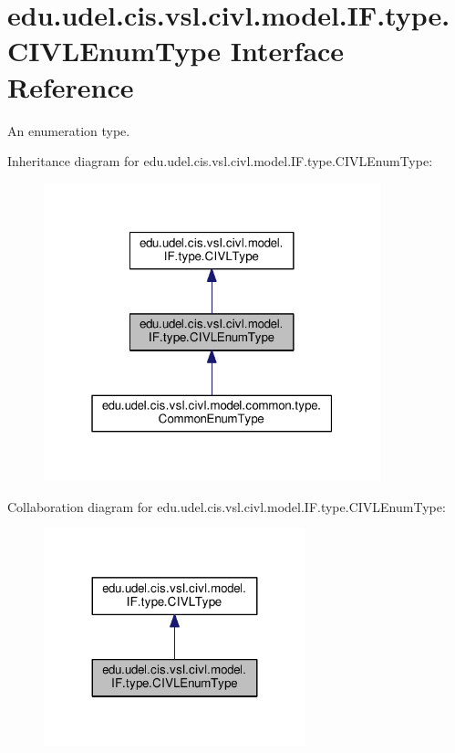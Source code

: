 \hypertarget{interfaceedu_1_1udel_1_1cis_1_1vsl_1_1civl_1_1model_1_1IF_1_1type_1_1CIVLEnumType}{}\section{edu.\+udel.\+cis.\+vsl.\+civl.\+model.\+I\+F.\+type.\+C\+I\+V\+L\+Enum\+Type Interface Reference}
\label{interfaceedu_1_1udel_1_1cis_1_1vsl_1_1civl_1_1model_1_1IF_1_1type_1_1CIVLEnumType}


An enumeration type.  




Inheritance diagram for edu.\+udel.\+cis.\+vsl.\+civl.\+model.\+I\+F.\+type.\+C\+I\+V\+L\+Enum\+Type\+:
\nopagebreak
\begin{figure}[H]
\begin{center}
\leavevmode
\includegraphics[width=277pt]{interfaceedu_1_1udel_1_1cis_1_1vsl_1_1civl_1_1model_1_1IF_1_1type_1_1CIVLEnumType__inherit__graph}
\end{center}
\end{figure}


Collaboration diagram for edu.\+udel.\+cis.\+vsl.\+civl.\+model.\+I\+F.\+type.\+C\+I\+V\+L\+Enum\+Type\+:
\nopagebreak
\begin{figure}[H]
\begin{center}
\leavevmode
\includegraphics[width=215pt]{interfaceedu_1_1udel_1_1cis_1_1vsl_1_1civl_1_1model_1_1IF_1_1type_1_1CIVLEnumType__coll__graph}
\end{center}
\end{figure}
